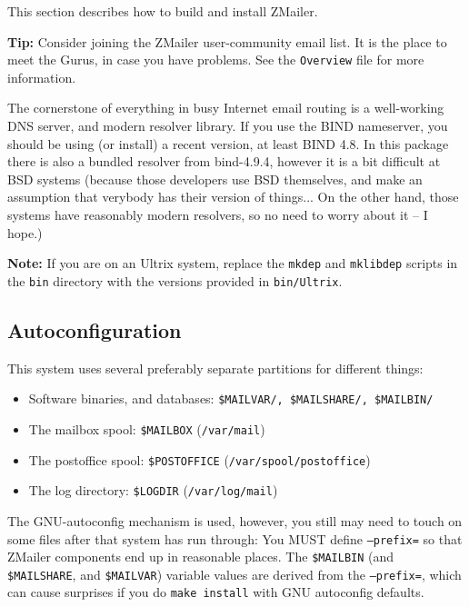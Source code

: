 
This section describes how to build and install ZMailer.

{\bf Tip:} Consider joining the ZMailer user-community email list.
It is the place to meet the Gurus, in case you have problems.
See the {\tt Overview} file for more information.

The cornerstone of everything in busy Internet email routing
is a well-working DNS server, and modern resolver library.
If you use the BIND nameserver, you should be using (or install)
a recent version, at least BIND 4.8. In this package there is also 
a bundled resolver from  bind-4.9.4, however it is a bit difficult at 
BSD systems (because those developers use BSD themselves, and make an 
assumption that verybody has their version of things...  On the other hand,
those systems have reasonably modern resolvers, so no need to worry about it
-- I hope.) 

{\bf Note:} If you are on an Ultrix system, replace the {\tt mkdep} and
{\tt mklibdep} scripts in the {\tt bin} directory with the versions
provided in {\tt bin/Ultrix}.


\subsection{Autoconfiguration}

This system uses several preferably separate partitions for
different things:
\begin{itemize}
\item Software binaries, and databases: {\tt \$MAILVAR/, \$MAILSHARE/, \$MAILBIN/}
\item The mailbox spool: {\tt \$MAILBOX} ({\tt /var/mail})
\item The postoffice spool: {\tt \$POSTOFFICE} ({\tt /var/spool/postoffice})
\item The log directory: {\tt \$LOGDIR} ({\tt /var/log/mail})
\end{itemize}

The GNU-autoconfig mechanism is used, however, you still may need to
touch on some files after that system has run through:
You MUST define {\tt --prefix=} so that ZMailer components end up
in reasonable places.  The {\tt \$MAILBIN} (and {\tt \$MAILSHARE},
and {\tt \$MAILVAR}) variable values are derived from
the {\tt --prefix=}, which can cause surprises if you do
{\tt make install} with GNU autoconfig defaults.

